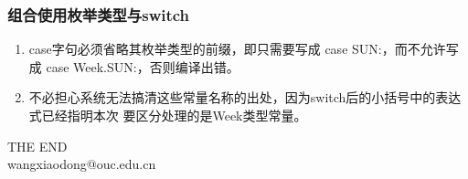 \begin{frame}[fragile] %
\frametitle{组合使用枚举类型与switch}


\pause


\begin{enumerate}
\item case字句必须省略其枚举类型的前缀，即只需要写成 case SUN:，而不允许写成 case
  Week.SUN:，否则编译出错。
\item 不必担心系统无法搞清这些常量名称的出处，因为switch后的小括号中的表达式已经指明本次
  要区分处理的是Week类型常量。
\end{enumerate}
\end{frame}


\begin{frame}[focus]
\centering
{\Huge {THE END}} \\
\vspace{5mm}
{\Large wangxiaodong@ouc.edu.cn} \\
\end{frame}

